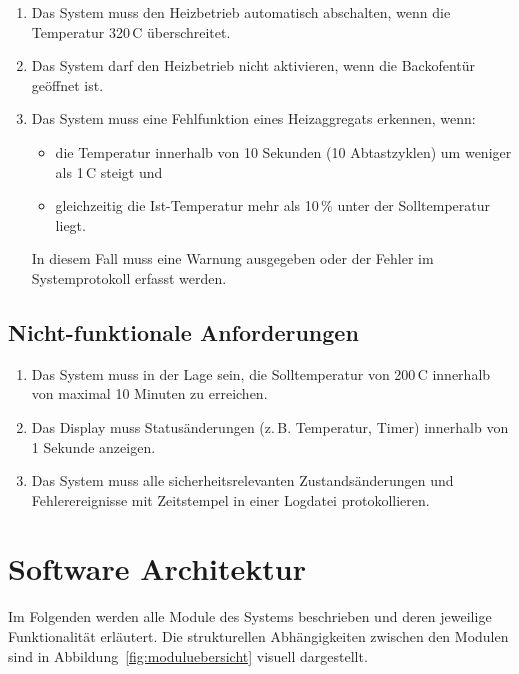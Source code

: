 \documentclass[a4paper,12pt]{article}
\begin{document}
\begin{enumerate}[label=\textbf{2.2.\arabic*}, itemsep=0pt, topsep=0pt, font=\bfseries]
    \item Das System muss den Heizbetrieb automatisch abschalten, wenn die Temperatur 320\,\textdegree{}C überschreitet.
    \item Das System darf den Heizbetrieb nicht aktivieren, wenn die Backofentür geöffnet ist.
    \item Das System muss eine Fehlfunktion eines Heizaggregats erkennen, wenn:
    \begin{itemize}
        \item die Temperatur innerhalb von 10 Sekunden (10 Abtastzyklen) um weniger als 1\,\textdegree{}C steigt und
        \item gleichzeitig die Ist-Temperatur mehr als 10\,\% unter der Solltemperatur liegt.
    \end{itemize}
    In diesem Fall muss eine Warnung ausgegeben oder der Fehler im Systemprotokoll erfasst werden.
\end{enumerate}

\subsection{Nicht-funktionale Anforderungen}

\begin{enumerate}[label=\textbf{2.3.\arabic*}, itemsep=0pt, topsep=0pt, font=\bfseries]
    \item Das System muss in der Lage sein, die Solltemperatur von 200\,\textdegree{}C innerhalb von maximal 10 Minuten zu erreichen.
    \item Das Display muss Statusänderungen (z.\,B. Temperatur, Timer) innerhalb von 1 Sekunde anzeigen.
    \item Das System muss alle sicherheitsrelevanten Zustandsänderungen und Fehlerereignisse mit Zeitstempel in einer Logdatei protokollieren.
\end{enumerate}

\newpage

\section{Software Architektur}

Im Folgenden werden alle Module des Systems beschrieben und deren jeweilige Funktionalität erläutert. Die strukturellen Abhängigkeiten zwischen den Modulen sind in Abbildung~\ref{fig:moduluebersicht} visuell dargestellt.
\end{document}
